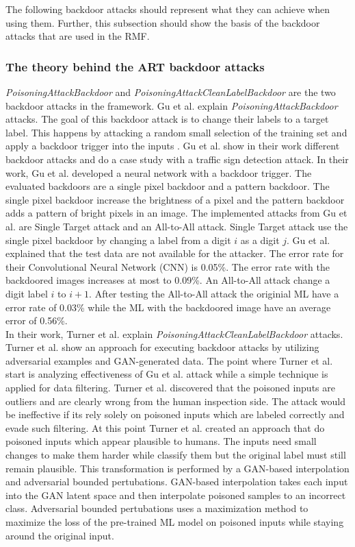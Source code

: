 The following backdoor attacks should represent what they can achieve when using them. Further, this subsection should show the basis of the backdoor attacks that are used in the RMF.

\subsubsection*{The theory behind the ART backdoor attacks}

\textit{PoisoningAttackBackdoor} and \textit{PoisoningAttackCleanLabelBackdoor} are the two backdoor attacks in the framework. Gu et al. \cite{DBLP:journals/corr/abs-1708-06733} explain \textit{PoisoningAttackBackdoor} attacks. The goal of this backdoor attack is to change their labels to a target label. This happens by attacking a random small selection of the training set and apply a backdoor trigger into the inputs \cite{turner2018clean}. Gu et al. show in their work different backdoor attacks and do a case study with a traffic sign detection attack. In their work, Gu et al. developed a neural network with a backdoor trigger. The evaluated backdoors are a single pixel backdoor and a pattern backdoor. The single pixel backdoor increase the brightness of a pixel and the pattern backdoor adds a pattern of bright pixels in an image. The implemented attacks from Gu et al. are Single Target attack and an All-to-All attack. Single Target attack use the single pixel backdoor by changing a label from a digit $i$ as a digit $j$. Gu et al. explained that the test data are not available for the attacker. The error rate for their Convolutional Neural Network (CNN) is 0.05\%. The error rate with the backdoored images increases at most to 0.09\%. An All-to-All attack change a digit label $i$ to $i + 1$. After testing the All-to-All attack the originial ML have a error rate of 0.03\% while the ML with the backdoored image have an average error of 0.56\%. \\
In their work, Turner et al. \cite{turner2018clean} explain
\textit{PoisoningAttackCleanLabelBackdoor} attacks. Turner et al. show an approach for executing backdoor attacks by utilizing adversarial examples and GAN-generated data. The point where Turner et al. start is analyzing effectiveness of Gu et al. attack while a simple technique is applied for data filtering. Turner et al. discovered that the poisoned inputs are outliers and are clearly wrong from the human inspection side. The attack would be ineffective if its rely solely on poisoned inputs which are labeled correctly and evade such filtering. At this point Turner et al. created an approach that do poisoned inputs which appear plausible to humans. The inputs need small changes to make them harder while classify them but the original label must still remain plausible. This transformation is performed by a GAN-based interpolation and adversarial bounded pertubations. GAN-based interpolation takes each input into the GAN latent space \cite{DBLP:conf/nips/GoodfellowPMXWOCB14} and then interpolate poisoned samples to an incorrect class. Adversarial bounded pertubations uses a maximization method to maximize the loss of the pre-trained ML model on poisoned inputs while staying around the original input.

